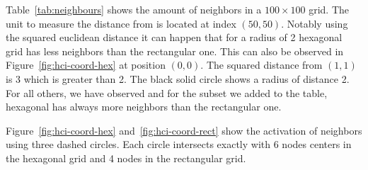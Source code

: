\documentclass{acm_proc_article-sp}
\begin{document}
Table~\ref{tab:neighbours} shows the amount of neighbors in a $100\times100$ grid. The unit to measure the distance from is located at index $(50,50)$. Notably using the squared euclidean distance it can happen that for a radius of 2 hexagonal grid has less neighbors than the rectangular one. This can also be observed in Figure~\ref{fig:hci-coord-hex} at position $(0,0)$. The squared distance from $(1,1)$ is 3 which is greater than 2. The black solid circle shows a radius of distance 2.
For all others, we have observed and for the subset we added to the table, hexagonal has always more neighbors than the rectangular one.

Figure~\ref{fig:hci-coord-hex} and~\ref{fig:hci-coord-rect} show the activation of neighbors using three dashed circles. Each circle intersects exactly with 6 nodes centers in the hexagonal grid and 4 nodes in the rectangular grid.

\end{document}
